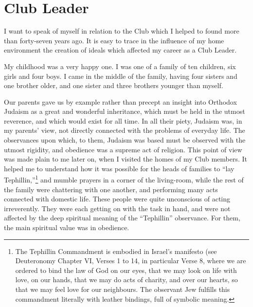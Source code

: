 \chapter{Club Leader}

I want to speak of myself in relation to the Club which
I helped to found more than forty-seven years ago. It is
easy to trace in the influence of my home environment
the creation of ideals which affected my career as
a Club Leader.

My childhood was a very happy one. I was one of a
family of ten children, six girls and four boys. I came in
the middle of the family, having four sisters and one
brother older, and one sister and three brothers younger
than myself.

Our parents gave us by example rather than precept
an insight into Orthodox Judaism as a great and wonderful
inheritance, which must be held in the utmost reverence,
and which would exist for all time. In all their
piety, Judaism was, in my parents’ view, not directly connected
with the problems of everyday life. The observances
upon which, to them, Judaism was based must be
observed with the utmost rigidity, and obedience was a
supreme act of religion. This point of view was made
plain to me later on, when I visited the homes of my Club
members. It helped me to understand how it was possible
for the heads of families to “lay Tephillin,”\footnote{The Tephillin
Commandment is embodied in Israel’s manifesto (see
Deuteronomy Chapter VI, Verses 1 to 14, in particular Verse 8, where we
are ordered to bind the law of God on our eyes, that we may look on life
with love, on our hands, that we may do acts of charity, and over our
hearts, so that we may feel love for our neighbours. The observant Jew
fulfills this commandment literally with leather bindings, full of symbolic
meaning.} and mumble
prayers in a corner of the living-room, while the rest of
the family were chattering with one another, and performing
many acts connected with domestic life. These
people were quite unconscious of acting irreverently. They
were each getting on with the task in hand, and were not
affected by the deep spiritual meaning of the “Tephillin”
observance. For them, the main spiritual value was in
obedience.

